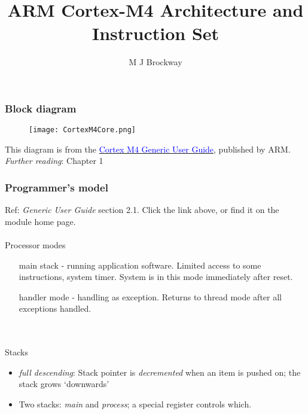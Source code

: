 \documentclass[10pt]{beamer}
\title{ARM Cortex-M4 Architecture and Instruction Set}
\author{M J Brockway}
\begin{document}
\maketitle

\begin{frame}
\frametitle{Block diagram}
\begin{figure}[!htb]
\begin{center}
\texttt{[image: CortexM4Core.png]}
\end{center}
\end{figure}
This diagram is from the \href{http://hesabu.net/kf5011/docs/DUI0553A_cortex_m4_dgug.pdf}{\textcolor{blue}{Cortex M4 Generic User Guide}}, published by ARM. \emph{Further reading}: Chapter 1
\end{frame}

\begin{frame}
\frametitle{Programmer's model}
Ref: \emph{Generic User Guide} section 2.1. Click the link above, or find it on the module home page.\\~\\

Processor modes 
\begin{itemize}
\item [main] stack - running application software. Limited access to some instructions, system timer. System is in this mode immediately after reset.
\item[handler] mode - handling as exception. Returns to thread mode after all exceptions handled.
\end{itemize}
~\\~\\
Stacks
\begin{itemize}
\item \emph{full descending}: Stack pointer is \emph{decremented} when an item is pushed on; the stack grows `downwards'
\item Two stacks: \emph{main} and \emph{process}; a special register controls which.
\end{itemize}
\end{frame}

\begin{frame}
\begin{center}

\end{center}
\end{frame}
\end{document}
